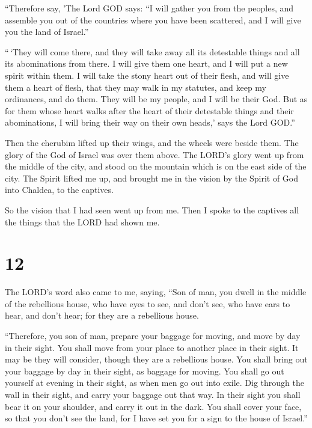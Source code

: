  ``Therefore say, 'The Lord GOD says: ``I will gather you
from the peoples, and assemble you out of the countries where you have
been scattered, and I will give you the land of Israel.''

 ``\,`They will come there, and they will take away all
its detestable things and all its abominations from there.
 I will give them one heart, and I will put a new spirit
within them. I will take the stony heart out of their flesh, and will
give them a heart of flesh,  that they may walk in my
statutes, and keep my ordinances, and do them. They will be my people,
and I will be their God.  But as for them whose heart
walks after the heart of their detestable things and their abominations,
I will bring their way on their own heads,' says the Lord GOD.''

 Then the cherubim lifted up their wings, and the wheels
were beside them. The glory of the God of Israel was over them above.
 The LORD's glory went up from the middle of the city,
and stood on the mountain which is on the east side of the city.
 The Spirit lifted me up, and brought me in the vision by
the Spirit of God into Chaldea, to the captives.

So the vision that I had seen went up from me.  Then I
spoke to the captives all the things that the LORD had shown me.

\hypertarget{section-10}{%
\section{12}\label{section-10}}

 The LORD's word also came to me, saying, 
``Son of man, you dwell in the middle of the rebellious house, who have
eyes to see, and don't see, who have ears to hear, and don't hear; for
they are a rebellious house.

 ``Therefore, you son of man, prepare your baggage for
moving, and move by day in their sight. You shall move from your place
to another place in their sight. It may be they will consider, though
they are a rebellious house.  You shall bring out your
baggage by day in their sight, as baggage for moving. You shall go out
yourself at evening in their sight, as when men go out into exile.
 Dig through the wall in their sight, and carry your
baggage out that way.  In their sight you shall bear it on
your shoulder, and carry it out in the dark. You shall cover your face,
so that you don't see the land, for I have set you for a sign to the
house of Israel.''


